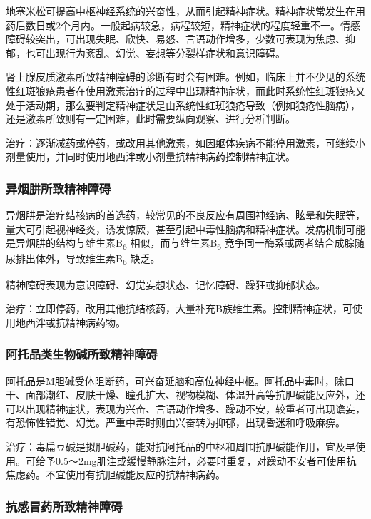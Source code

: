 地塞米松可提高中枢神经系统的兴奋性，从而引起精神症状。精神症状常发生在用药后数日或2个月内。一般起病较急，病程较短，精神症状的程度轻重不一。情感障碍较突出，可出现失眠、欣快、易怒、言语动作增多，少数可表现为焦虑、抑郁，也可出现行为紊乱、幻觉、妄想等分裂样症状和意识障碍。

肾上腺皮质激素所致精神障碍的诊断有时会有困难。例如，临床上并不少见的系统性红斑狼疮患者在使用激素治疗的过程中出现精神症状，而此时系统性红斑狼疮又处于活动期，那么要判定精神症状是由系统性红斑狼疮导致（例如狼疮性脑病），还是激素所致则有一定困难，此时需要纵向观察、进行分析判断。

治疗：逐渐减药或停药，或改用其他激素，如因躯体疾病不能停用激素，可继续小剂量使用，并同时使用地西泮或小剂量抗精神病药控制精神症状。

\subsubsection{异烟肼所致精神障碍}

异烟肼是治疗结核病的首选药，较常见的不良反应有周围神经病、眩晕和失眠等，量大可引起视神经炎，诱发惊厥，甚至引起中毒性脑病和精神症状。发病机制可能是异烟肼的结构与维生素B\textsubscript{6}
相似，而与维生素B\textsubscript{6}
竞争同一酶系或两者结合成腙随尿排出体外，导致维生素B\textsubscript{6}
缺乏。

精神障碍表现为意识障碍、幻觉妄想状态、记忆障碍、躁狂或抑郁状态。

治疗：立即停药，改用其他抗结核药，大量补充B族维生素。控制精神症状，可使用地西泮或抗精神病药物。

\subsubsection{阿托品类生物碱所致精神障碍}

阿托品是M胆碱受体阻断药，可兴奋延脑和高位神经中枢。阿托品中毒时，除口干、面部潮红、皮肤干燥、瞳孔扩大、视物模糊、体温升高等抗胆碱能反应外，还可以出现精神症状，表现为兴奋、言语动作增多、躁动不安，较重者可出现谵妄，有恐怖性错觉、幻觉。严重中毒时则由兴奋转为抑郁，出现昏迷和呼吸麻痹。

治疗：毒扁豆碱是拟胆碱药，能对抗阿托品的中枢和周围抗胆碱能作用，宜及早使用。可给予0.5～2mg肌注或缓慢静脉注射，必要时重复，对躁动不安者可使用抗焦虑药。不宜使用有抗胆碱能反应的抗精神病药。

\subsubsection{抗感冒药所致精神障碍}

